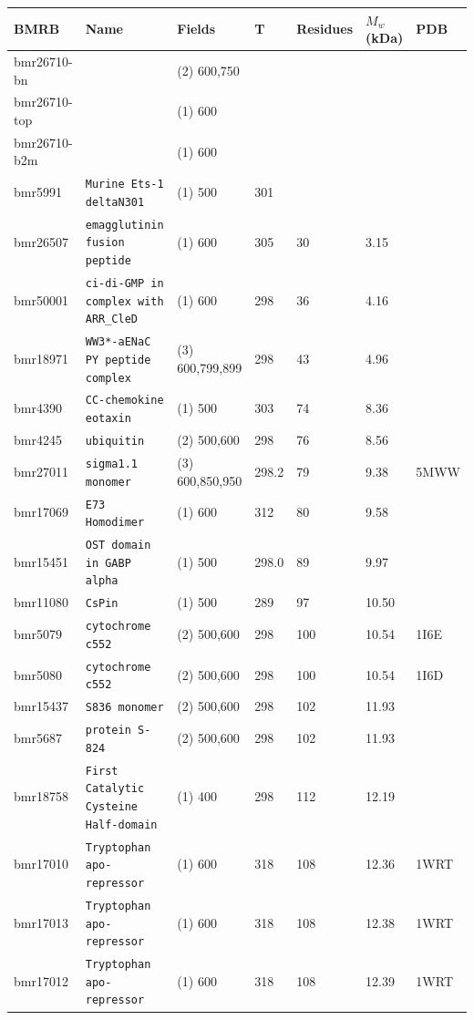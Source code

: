 \documentclass[showkeys,aps,prb,prepreint,amssymb, amsmath,nobibnotes]{article}
\begin{document}
\begin{tiny}\noindent \begin{tabular}{lllllll}

\textbf{BMRB} & \textbf{Name} & \textbf{Fields}& \textbf{T} & \textbf{Residues} & \textbf{$M_w$ (kDa)} & \textbf{PDB}\\
\hline
bmr26710-bn & \verb|| & (2) 600,750& & & & \\
bmr26710-top & \verb|| & (1) 600& & & & \\
bmr26710-b2m & \verb|| & (1) 600& & & & \\
bmr5991 & \verb|Murine Ets-1 deltaN301| & (1) 500& 301& & & \\
bmr26507 & \verb|emagglutinin fusion peptide| & (1) 600& 305&  30& 3.15& \\
bmr50001 & \verb|ci-di-GMP in complex with ARR_CleD| & (1) 600& 298&  36& 4.16& \\
bmr18971 & \verb|WW3*-aENaC PY peptide complex| & (3) 600,799,899& 298&  43& 4.96& \\
bmr4390 & \verb|CC-chemokine eotaxin| & (1) 500& 303&  74& 8.36& \\
bmr4245 & \verb|ubiquitin| & (2) 500,600& 298&  76& 8.56& \\
bmr27011 & \verb|sigma1.1 monomer| & (3) 600,850,950& 298.2&  79& 9.38& 5MWW\\
bmr17069 & \verb|E73 Homodimer| & (1) 600& 312&  80& 9.58& \\
bmr15451 & \verb|OST domain in GABP alpha| & (1) 500& 298.0&  89& 9.97& \\
bmr11080 & \verb|CsPin| & (1) 500& 289&  97& 10.50& \\
bmr5079 & \verb|cytochrome c552| & (2) 500,600& 298&  100& 10.54& 1I6E\\
bmr5080 & \verb|cytochrome c552| & (2) 500,600& 298&  100& 10.54& 1I6D\\
bmr15437 & \verb|S836 monomer| & (2) 500,600& 298&  102& 11.93& \\
bmr5687 & \verb|protein S-824| & (2) 500,600& 298&  102& 11.93& \\
bmr18758 & \verb|First Catalytic Cysteine Half-domain| & (1) 400& 298&  112& 12.19& \\
bmr17010 & \verb|Tryptophan apo-repressor| & (1) 600& 318&  108& 12.36& 1WRT\\
bmr17013 & \verb|Tryptophan apo-repressor| & (1) 600& 318&  108& 12.38& 1WRT\\
bmr17012 & \verb|Tryptophan apo-repressor| & (1) 600& 318&  108& 12.39& 1WRT\\

\end{tabular}
\end{tiny}
\end{document}
